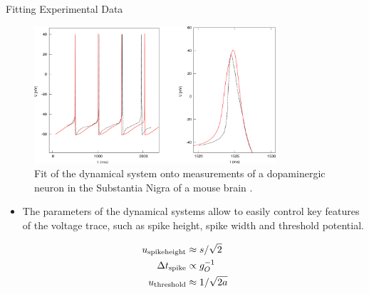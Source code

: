 \documentclass{beamer}
\begin{document}
\begin{frame}[t]
\begin{columns}
\begin{column}{.45\textwidth}
\begin{myblock}{Fitting Experimental Data}
\begin{figure}
\includegraphics[width=0.8\textwidth]{../figures/graphics/spikefit.png}
\caption{Fit of the dynamical system onto measurements of a dopaminergic
neuron in the Substantia Nigra of a mouse brain \cite{Bean_2007}.}
\label{fig:spikefit}
\end{figure}
\begin{itemize}
\item The parameters of the dynamical systems allow to easily control key features of the voltage trace, such as spike height, spike width and threshold potential.
\end{itemize}
\begin{align*}
u_{\rm spike height} &\approx s/\sqrt{2} \\
\Delta t_{\rm spike} &\propto g_O^{-1} \\
u_{\rm threshold} &\approx 1/\sqrt{2a}
\end{align*}
\end{myblock}


\end{column}
\end{columns}
\end{frame}
\end{document}
